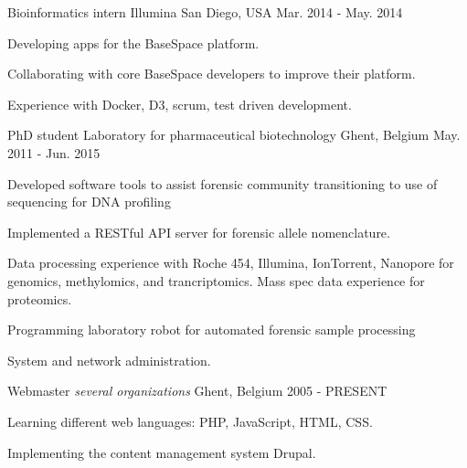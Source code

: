 \begin{cventries}
  \cventry
    {Bioinformatics intern} %
    {Illumina} %
    {San Diego, USA} %
    {Mar. 2014 - May. 2014} %
    {
      \begin{cvitems} %
        \item {Developing apps for the BaseSpace platform.}
        \item {Collaborating with core BaseSpace developers to improve
            their platform.}
        \item {Experience with Docker, D3, scrum, test driven development.}
      \end{cvitems}
    }

  \cventry
    {PhD student } %
    {Laboratory for pharmaceutical biotechnology} %
    {Ghent, Belgium} %
    {May. 2011 - Jun. 2015} %
    {
      \begin{cvitems} %
        \item {Developed software tools to assist forensic community
            transitioning to use of sequencing for DNA profiling}
        \item {Implemented a RESTful API server for forensic allele
            nomenclature.}
        \item {Data processing experience with Roche 454, Illumina,
            IonTorrent, Nanopore for genomics, methylomics, and
            trancriptomics. Mass spec data experience for proteomics.}
        \item {Programming laboratory robot for automated forensic
            sample processing}
        \item {System and network administration.}
      \end{cvitems}
    }

  \cventry
    {Webmaster} %
    {\emph{several organizations}} %
    {Ghent, Belgium} %
    {2005 - PRESENT} %
    {
      \begin{cvitems} %
        \item {Learning different web languages: PHP, JavaScript, HTML, CSS.}
        \item {Implementing the content management system Drupal.}
      \end{cvitems}
    }

\end{cventries}
